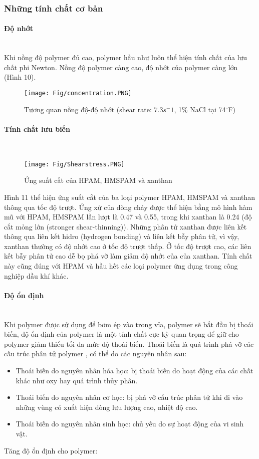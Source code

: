 \documentclass[12pt,a4paper]{article}
\newcommand{\subsubsubsection}[1]{\paragraph{#1}\mbox{}\\}
\begin{document}
	\subsubsection{Những tính chất cơ bản}
	\subsubsubsection{Độ nhớt}
	Khi nồng độ polymer đủ cao, polymer hầu như luôn thể hiện tính chất của lưu chất phi Newton. Nồng độ polymer càng cao, độ nhớt của polymer càng lớn (Hình 10).
		\begin{figure}[h]
			\centering
			\texttt{[image: Fig/concentration.PNG]}
			\caption{Tương quan nồng độ-độ nhớt (shear rate: $7.3s^-1$, 1\% NaCl tại 74$^\circ$F) \cite{sorbie2013polymer}}
		\end{figure}
	\subsubsubsection{Tính chất lưu biến}
		\begin{figure}[h]
			\centering
			\texttt{[image: Fig/Shearstress.PNG]}
			\caption{Ứng suất cắt của HPAM, HMSPAM và xanthan \cite{wei2014mechanical}}
		\end{figure}
	\newline
	Hình 11 thể hiện ứng suất cắt của ba loại polymer HPAM, HMSPAM và xanthan thông qua tốc độ trượt. Ứng xử của dòng chảy được thể hiện bằng mô hình hàm mũ với HPAM, HMSPAM lần lượt là 0.47 và 0.55, trong khi xanthan là 0.24 (độ cắt mỏng lớn (stronger shear-thinning)). Những phân tử xanthan được liên kết thông qua liên kết hidro (hydrogen bonding) và liên kết bẫy phân tử, vì vậy, xanthan thường có độ nhớt cao ở tốc độ trượt thấp. Ở tốc độ trượt cao, các liên kết bẫy phân tử cao dễ bọ phá vỡ làm giảm độ nhớt của của xanthan. Tính chất này cũng đúng với HPAM và hầu hết các loại polymer ứng dụng trong công nghiệp dầu khí khác.
	\subsubsubsection{Độ ổn định}	
	Khi polymer được sử dụng để bơm ép vào trong vỉa, polymer sẽ bắt đầu bị thoái biến, độ ổn định của polymer là một tính chất cực kỳ quan trọng để giữ cho polymer giảm thiểu tối đa mức độ thoái biến. Thoái biến là quá trình phá vỡ các cấu trúc phân tử polymer \cite{sorbie2013polymer}, có thể do các nguyên nhân sau:
		\begin{itemize}
			\item Thoái biến do nguyên nhân hóa học: bị thoái biến do hoạt động của các chất khác như oxy hay quá trình thủy phân.
			\item Thoái biến do nguyên nhân cơ học: bị phá vỡ cấu trúc phân tử khi đi vào những vùng có xuất hiện dòng lưu lượng cao, nhiệt độ cao.
			\item Thoái biến do nguyên nhân sinh học: chủ yếu do sự hoạt động của vi sinh vật.
		\end{itemize}
	Tăng độ ổn định cho polymer:
\end{document}
